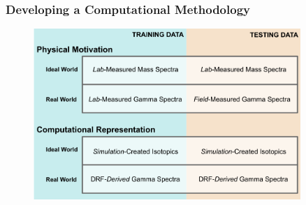\begin{frame}
  \frametitle{Developing a Computational Methodology}
  \begin{figure}[h!]
    \centering
    \includegraphics[width=0.9\textwidth]{./figures/project_design.png}
  \end{figure}
\end{frame}

